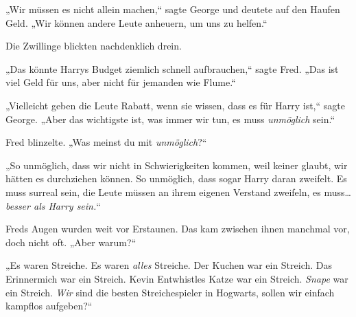 „Wir müssen es nicht allein machen,“ sagte George und deutete auf den Haufen Geld. „Wir können andere Leute anheuern, um uns zu helfen.“

Die Zwillinge blickten nachdenklich drein.

„Das könnte Harrys Budget ziemlich schnell aufbrauchen,“ sagte Fred. „Das ist viel Geld für uns, aber nicht für jemanden wie Flume.“

„Vielleicht geben die Leute Rabatt, wenn sie wissen, dass es für Harry ist,“ sagte George. „Aber das wichtigste ist, was immer wir tun, es muss \emph{unmöglich} sein.“

Fred blinzelte. „Was meinst du mit \emph{unmöglich}?“

„So unmöglich, dass wir nicht in Schwierigkeiten kommen, weil keiner glaubt, wir hätten es durchziehen können. So unmöglich, dass sogar Harry daran zweifelt. Es muss surreal sein, die Leute müssen an ihrem eigenen Verstand zweifeln, es muss… \emph{besser als Harry sein.}“

Freds Augen wurden weit vor Erstaunen. Das kam zwischen ihnen manchmal vor, doch nicht oft. „Aber warum?“

„Es waren Streiche. Es waren \emph{alles} Streiche. Der Kuchen war ein Streich. Das Erinnermich war ein Streich. Kevin Entwhistles Katze war ein Streich. \emph{Snape} war ein Streich. \emph{Wir} sind die besten Streichespieler in Hogwarts, sollen wir einfach kampflos aufgeben?“

